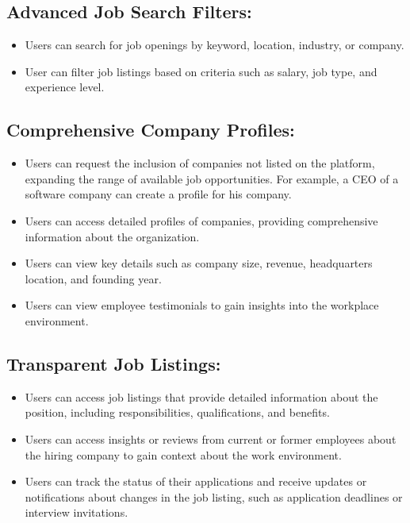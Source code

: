 \documentclass[titlepage]{article}
\begin{document}
\subsection{Advanced Job Search Filters:}
\begin{itemize}
    \item Users can search for job openings by keyword, location, industry, or company.
    \item User can filter job listings based on criteria such as salary, job type, and experience level.
\end{itemize}

\subsection{Comprehensive Company Profiles:}
\begin{itemize}
    \item Users can request the inclusion of companies not listed on the platform, expanding the range of available job opportunities. For example, a CEO of a software company can create a profile for his company.
    \item Users can access detailed profiles of companies, providing comprehensive information about the organization.
    \item Users can view key details such as company size, revenue, headquarters location, and founding year.
    \item Users can view employee testimonials to gain insights into the workplace environment.
\end{itemize}

\subsection{Transparent Job Listings:}
\begin{itemize}
    \item Users can access job listings that provide detailed information about the position, including responsibilities, qualifications, and benefits.
    \item Users can access insights or reviews from current or former employees about the hiring company to gain context about the work environment.
    \item Users can track the status of their applications and receive updates or notifications about changes in the job listing, such as application deadlines or interview invitations.
\end{itemize}
\end{document}
